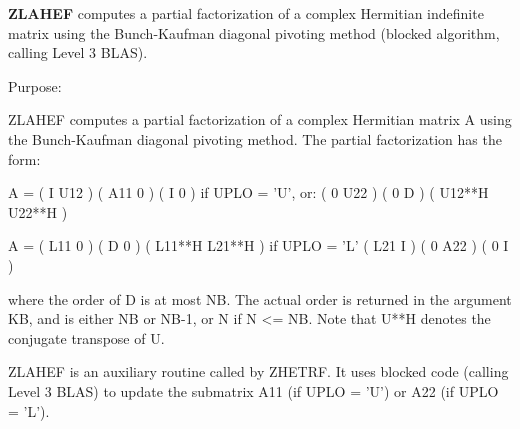 {\bfseries Z\+L\+A\+H\+E\+F} computes a partial factorization of a complex Hermitian indefinite matrix using the Bunch-\/\+Kaufman diagonal pivoting method (blocked algorithm, calling Level 3 B\+L\+A\+S). 

 \begin{DoxyParagraph}{Purpose\+: }
\begin{DoxyVerb} ZLAHEF computes a partial factorization of a complex Hermitian
 matrix A using the Bunch-Kaufman diagonal pivoting method. The
 partial factorization has the form:

 A  =  ( I  U12 ) ( A11  0  ) (  I      0     )  if UPLO = 'U', or:
       ( 0  U22 ) (  0   D  ) ( U12**H U22**H )

 A  =  ( L11  0 ) (  D   0  ) ( L11**H L21**H )  if UPLO = 'L'
       ( L21  I ) (  0  A22 ) (  0      I     )

 where the order of D is at most NB. The actual order is returned in
 the argument KB, and is either NB or NB-1, or N if N <= NB.
 Note that U**H denotes the conjugate transpose of U.

 ZLAHEF is an auxiliary routine called by ZHETRF. It uses blocked code
 (calling Level 3 BLAS) to update the submatrix A11 (if UPLO = 'U') or
 A22 (if UPLO = 'L').\end{DoxyVerb}
 
\end{DoxyParagraph}

